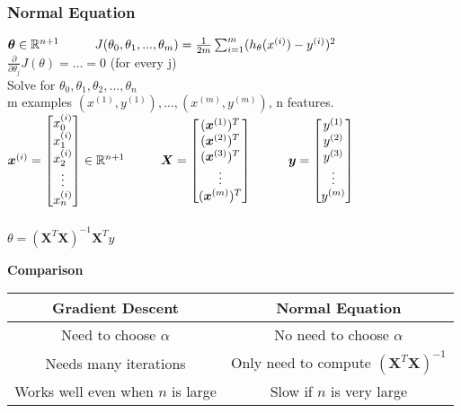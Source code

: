 \documentclass{article}
\newcommand\tab[1][1cm]{\hspace*{#1}}
\newcommand{\vect}[1]{\boldsymbol{#1}}
\begin{document}
\subsubsection{Normal Equation}
$\vect{\theta} \in \mathbb{R}^{n+1} \tab J(\theta_0, \theta_1, ..., \theta_m) = \frac{1}{2m}\sum_{i=1}^{m}(h_\theta(x^{(i)}) - y^{(i)})^2$ \\

$\frac{\partial}{\partial \theta_j}J(\theta) = ... = 0$ (for every j) \\

Solve for $\theta_0, \theta_1, \theta_2, ... ,\theta_n$ \\

m examples $(x^{(1)}, y^{(1)}), ..., (x^{(m)}, y^{(m)})$, n features. \\
$\vect{x}^{(i)} = \begin{bmatrix}
x_0^{(i)} \\ x_1^{(i)} \\ x_2^{(i)} \\ \vdots \\ x_n^{(i)}
\end{bmatrix} \in \mathbb{R}^{n+1}
\tab
\vect{X} = \begin{bmatrix}
(\vect{x}^{(1)})^T \\ (\vect{x}^{(2)})^T \\ (\vect{x}^{(3)})^T\\ \vdots \\ (\vect{x}^{(m)})^T
\end{bmatrix}
\tab
\vect{y} = \begin{bmatrix}
y^{(1)} \\ y^{(2)} \\ y^{(3)} \\ \vdots \\ y^{(m)}
\end{bmatrix}
$\\\\

$\theta = (\vect{X}^T\vect{X})^{-1}\vect{X}^Ty$ \\


\begin{center}
\textbf{Comparison} \\
\begin{tabular}{ |c | c | }
\hline
Gradient Descent & Normal Equation \\ 
\hline
Need to choose $\alpha$ & No need to choose $\alpha$ \\  
\hline
Needs many iterations & Only need to compute $(\vect{X}^T\vect{X})^{-1}$ \\
\hline
Works well even when $n$ is large & Slow if $n$ is very large \\
\hline
\end{tabular}
\end{center}
\end{document}
